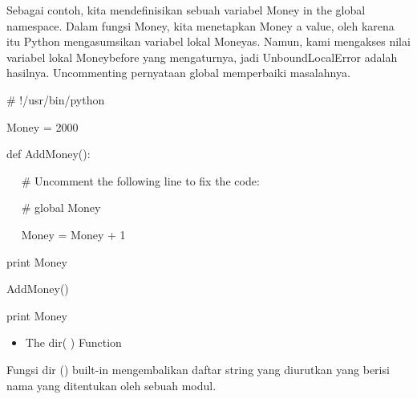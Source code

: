 \vspace{\baselineskip}
\noindent Sebagai contoh, kita mendefinisikan sebuah variabel Money in the global namespace. Dalam fungsi Money, kita menetapkan Money a value, oleh karena itu Python mengasumsikan variabel lokal Moneyas. Namun, kami mengakses nilai variabel lokal Moneybefore yang mengaturnya, jadi UnboundLocalError adalah hasilnya. Uncommenting pernyataan global memperbaiki masalahnya.\par
\vspace{\baselineskip}
\hspace*{0.5in}
\vspace{\baselineskip}
\noindent $\#$ !/usr/bin/python\par


\noindent \hspace*{0.5in}Money = 2000\par


\noindent \hspace*{0.5in}def AddMoney():\par


\noindent \hspace*{0.5in}~~ $\#$  Uncomment the following line to fix the code:\par


\noindent \hspace*{0.5in}~~ $\#$  global Money\par


\noindent \hspace*{0.5in}~~ Money = Money + 1\par


\vspace{\baselineskip}
\noindent \hspace*{0.5in}print Money\par


\noindent \hspace*{0.5in}AddMoney()\par


\noindent \hspace*{0.5in}print Money\par


\vspace{\baselineskip}
\begin{itemize}
	\item The dir( ) Function
\end{itemize}

\noindent Fungsi dir () built-in mengembalikan daftar string yang diurutkan yang berisi nama yang ditentukan oleh sebuah modul.\par


